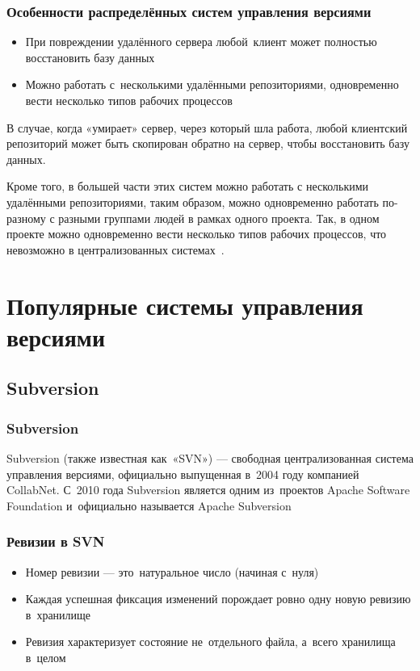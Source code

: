 \documentclass{../industrial-development}
\begin{document}
\begin{frame} \frametitle{Особенности распределённых систем управления версиями}
  \begin{itemize}
  \item При повреждении удалённого сервера любой~клиент может полностью восстановить базу данных
  \item Можно работать с~несколькими удалёнными репозиториями, одновременно вести несколько типов рабочих процессов
  \end{itemize}
\end{frame}

\lecturenotes

В случае, когда «умирает» сервер, через который шла работа, любой клиентский репозиторий может быть скопирован обратно на сервер, чтобы восстановить базу данных. 

Кроме того, в большей части этих систем можно работать с несколькими удалёнными репозиториями, таким образом, можно одновременно работать по-разному с разными группами людей в рамках одного проекта. Так, в одном проекте можно одновременно вести несколько типов рабочих процессов, что невозможно в централизованных системах~\cite[с.~7]{ProGit}.

\section{Популярные системы управления версиями}

\subsection{Subversion}

\begin{frame} \frametitle{Subversion}
  \begin{block}{}
    \alert{Subversion (также известная как~«SVN»)} --- свободная централизованная система управления версиями, официально выпущенная в~2004 году компанией CollabNet. С~2010 года Subversion является одним из~проектов Apache Software Foundation и~официально называется Apache Subversion
  \end{block}
\end{frame}

\begin{frame} \frametitle{Ревизии в SVN}
  
  \begin{itemize}
  \item Номер ревизии --- это~натуральное число (начиная с~нуля)
  \item Каждая успешная фиксация изменений порождает ровно одну новую ревизию в~хранилище
  \item Ревизия характеризует состояние не~отдельного файла, а~всего хранилища в~целом
  \end{itemize}
\end{frame}
\end{document}
